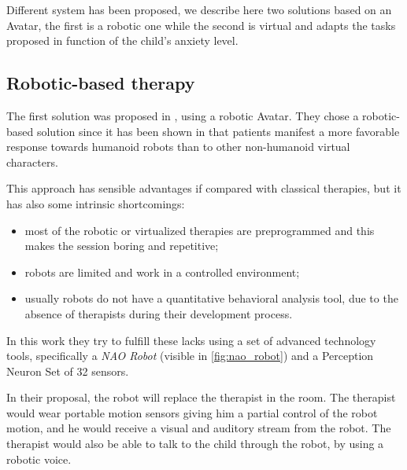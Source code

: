 \documentclass[12pt,journal,draftclsnofoot,onecolumn]{IEEEtran}
\begin{document}
Different system has been proposed, we describe here two solutions based on an Avatar, the first is a robotic one while the second is virtual and adapts the tasks proposed in function of the child's anxiety level.

\subsection{Robotic-based therapy}
\label{sec:robotic}

The first solution was proposed in \cite{Alahbabi17}, using a robotic Avatar.
They chose a robotic-based solution since it has been shown in \cite{Pioggia08} that patients manifest a more favorable response towards humanoid robots than to other non-humanoid virtual characters.

This approach has sensible advantages if compared with classical therapies, but it has also some intrinsic shortcomings:
\begin{itemize}
	\item most of the robotic or virtualized therapies are preprogrammed and this makes the session boring and repetitive;
	\item robots are limited and work in a controlled environment;
	\item usually robots do not have a quantitative behavioral analysis tool, due to the absence of therapists during their development process.
\end{itemize}

In this work they try to fulfill these lacks using a set of advanced technology tools, specifically a \textit{NAO Robot} (visible in \autoref{fig:nao_robot}) and a Perception Neuron Set of 32 sensors.

In their proposal, the robot will replace the therapist in the room.
The therapist would wear portable motion sensors giving him a partial control of the robot motion, and he would receive a visual and auditory stream from the robot. The therapist would also be able to talk to the child through the robot, by using a robotic voice.
\end{document}
